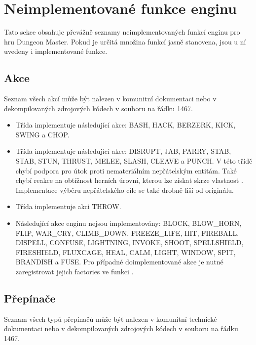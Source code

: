 \section{Neimplementované funkce enginu}\label{not-implemented}

Tato sekce obsahuje převážně seznamy neimplementovaných funkcí enginu pro hru Dungeon Master. Pokud je určitá množina funkcí jasně stanovena,
jsou u ní uvedeny i implementované funkce.

\subsection{Akce}
Seznam všech akcí může být nalezen v komunitní dokumentaci \cite{TechnicalDocumentationFontanel05} nebo 
v dekompilovaných zdrojových kódech \cite{DMDecompilation} v souboru  na řádku 1467.

\begin{itemize}

\item Třída  implementuje následující akce: BASH, HACK, BERZERK, KICK, SWING a CHOP. 

\item Třída  implementuje následující akce: DISRUPT, JAB, PARRY, STAB, STAB, STUN, THRUST, MELEE, SLASH, CLEAVE a PUNCH.
V této třídě chybí podpora pro útok proti nemateriálním nepřátelským entitám. Také chybí reakce na obtížnost herních úrovní, kterou lze získat
skrze vlastnost . Implementace výběru nepřátelského cíle se také drobně liší od originálu.
            
\item Třída  implementuje akci THROW. 

\item Následující akce enginu nejsou implementovány: BLOCK, BLOW\_HORN, FLIP, WAR\_CRY, CLIMB\_DOWN, FREEZE\_LIFE, HIT, FIREBALL, DISPELL,
CONFUSE, LIGHTNING, INVOKE, SHOOT, SPELLSHIELD, FIRESHIELD, FLUXCAGE, HEAL, CALM, LIGHT, WINDOW, SPIT, BRANDISH a FUSE.
Pro případné doimplementované akce je nutné zaregistrovat jejich factories ve funkci .

\end{itemize}

\subsection{Přepínače}
Seznam všech typů přepínačů může být nalezen v komunitní technické dokumentaci \cite{TechnicalDocumentationFontanel05}  nebo 
v dekompilovaných zdrojových kódech \cite{DMDecompilation} v souboru  na řádku 1467.

